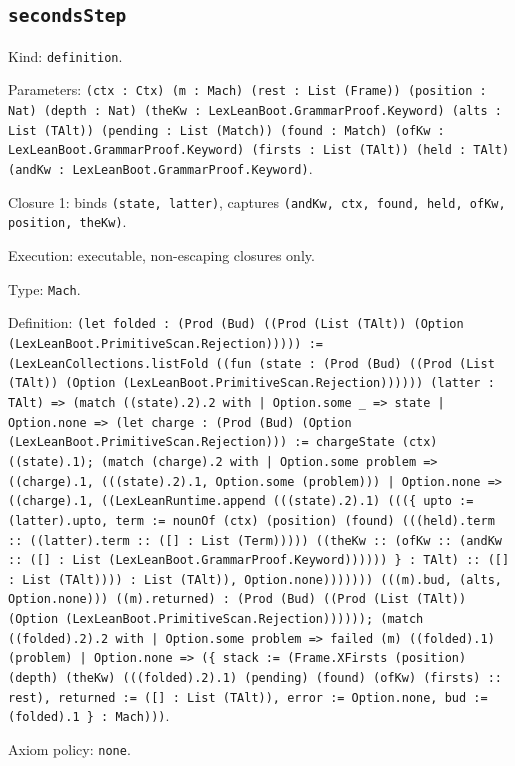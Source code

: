 \documentclass[11pt]{article}
\begin{document}
\subsection*{\texttt{secondsStep}}
\noindent Kind: \texttt{definition}.\par
\noindent Parameters: \texttt{(ctx : Ctx) (m : Mach) (rest : List (Frame)) (position : Nat) (depth : Nat) (theKw : LexLeanBoot.GrammarProof.Keyword) (alts : List (TAlt)) (pending : List (Match)) (found : Match) (ofKw : LexLeanBoot.GrammarProof.Keyword) (firsts : List (TAlt)) (held : TAlt) (andKw : LexLeanBoot.GrammarProof.Keyword)}.\par
\noindent Closure 1: binds \texttt{(state, latter)}, captures \texttt{(andKw, ctx, found, held, ofKw, position, theKw)}.\par
\noindent Execution: executable, non-escaping closures only.\par
\noindent Type: \texttt{Mach}.\par
\noindent Definition: \texttt{(let folded : (Prod (Bud) ((Prod (List (TAlt)) (Option (LexLeanBoot.PrimitiveScan.Rejection))))) := (LexLeanCollections.listFold ((fun (state : (Prod (Bud) ((Prod (List (TAlt)) (Option (LexLeanBoot.PrimitiveScan.Rejection)))))) (latter : TAlt) => (match ((state).2).2 with | Option.some \_ => state | Option.none => (let charge : (Prod (Bud) (Option (LexLeanBoot.PrimitiveScan.Rejection))) := chargeState (ctx) ((state).1); (match (charge).2 with | Option.some problem => ((charge).1, (((state).2).1, Option.some (problem))) | Option.none => ((charge).1, ((LexLeanRuntime.append (((state).2).1) (((\{ upto := (latter).upto, term := nounOf (ctx) (position) (found) (((held).term :: ((latter).term :: ([] : List (Term))))) ((theKw :: (ofKw :: (andKw :: ([] : List (LexLeanBoot.GrammarProof.Keyword)))))) \} : TAlt) :: ([] : List (TAlt)))) : List (TAlt)), Option.none))))))) (((m).bud, (alts, Option.none))) ((m).returned) : (Prod (Bud) ((Prod (List (TAlt)) (Option (LexLeanBoot.PrimitiveScan.Rejection)))))); (match ((folded).2).2 with | Option.some problem => failed (m) ((folded).1) (problem) | Option.none => (\{ stack := (Frame.XFirsts (position) (depth) (theKw) (((folded).2).1) (pending) (found) (ofKw) (firsts) :: rest), returned := ([] : List (TAlt)), error := Option.none, bud := (folded).1 \} : Mach)))}.\par
\noindent Axiom policy: \texttt{none}.\par
\end{document}
